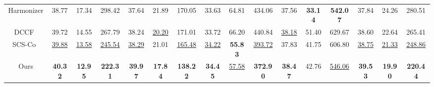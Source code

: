 \documentclass[10pt,twocolumn,letterpaper]{article}
\begin{document}
\begin{table*}[!t]
{\begin{tabular}{cccccccccccccccc}
    Harmonizer~\cite{Harmonizer} & 38.77 & 17.34 & 298.42 & 37.64 & 21.89 & 170.05 & 33.63 & 64.81 & 434.06 & 37.56 & {\bf 33.14} & {\bf 542.07} & 37.84 & 24.26 & 280.51 \\ 
    DCCF~\cite{xue2022dccf} & 39.72 & 14.55 & 267.79 & 38.24 & \underline{20.20} & 171.01 & 33.72 & 66.20 & 440.84 & \underline{38.18} & 51.40 & 629.67 & 38.60 & 22.64& 265.41 \\ 
    SCS-Co~\cite{Hang_2022_CVPR} & \underline{39.88} & \underline{13.58} & \underline{245.54} & \underline{38.29} & 21.01 & \underline{165.48} & \underline{34.22} & {\bf 55.83} & \underline{393.72} & 37.83 & 41.75 & 606.80 & \underline{38.75} & \underline{21.33} & \underline{248.86} \\
    \midrule
    Ours & {\bf 40.32} & {\bf 12.95} & {\bf 222.31} & {\bf 39.97} & {\bf 17.84} & {\bf 138.22} & {\bf 34.45} & \underline{57.58} & {\bf 372.90} & {\bf 38.47} & 42.76 &  \underline{546.06} & {\bf 39.53} & {\bf 19.90} & {\bf 220.44} \\
    \bottomrule[1.25pt]
    \end{tabular}}

  \label{tab:sotas}\vspace{-1.0em}
\end{table*}
\end{document}
